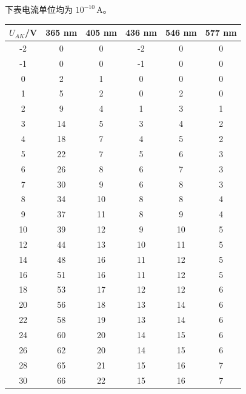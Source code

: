 下表电流单位均为 $10^{-10}\,\mathrm A$。

\begin{center}\small{}
\renewcommand{\arraystretch}{1.25}
\begin{tabular}{|c|c|c|c|c|c|}
\hline
$U_{AK}$/V & 365 nm & 405 nm & 436 nm & 546 nm & 577 nm\\\hline
-2 & 0 & 0 & -2 & 0 & 0\\\hline
-1 & 0 & 0 & -1 & 0 & 0\\\hline
0 & 2 & 1 & 0 & 0 & 0\\\hline
1 & 5 & 2 & 0 & 2 & 0\\\hline
2 & 9 & 4 & 1 & 3 & 1\\\hline
3 & 14 & 5 & 3 & 4 & 2\\\hline
4 & 18 & 7 & 4 & 5 & 2\\\hline
5 & 22 & 7 & 5 & 6 & 3\\\hline
6 & 26 & 8 & 6 & 7 & 3\\\hline
7 & 30 & 9 & 6 & 8 & 3\\\hline
8 & 34 & 10 & 8 & 8 & 4\\\hline
9 & 37 & 11 & 8 & 9 & 4\\\hline
10 & 39 & 12 & 9 & 10 & 5\\\hline
12 & 44 & 13 & 10 & 11 & 5\\\hline
14 & 48 & 16 & 11 & 12 & 5\\\hline
16 & 51 & 16 & 11 & 12 & 5\\\hline
18 & 53 & 17 & 12 & 12 & 6\\\hline
20 & 56 & 18 & 13 & 14 & 6\\\hline
22 & 58 & 19 & 13 & 14 & 6\\\hline
24 & 60 & 20 & 14 & 15 & 6\\\hline
26 & 62 & 20 & 14 & 15 & 6\\\hline
28 & 65 & 21 & 15 & 16 & 7\\\hline
30 & 66 & 22 & 15 & 16 & 7\\\hline
\end{tabular}
\end{center}


